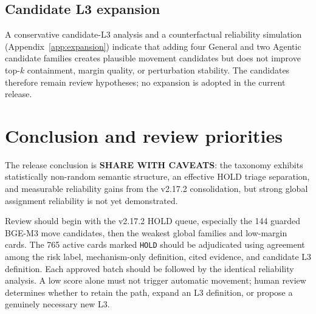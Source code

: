 \documentclass[11pt,a4paper]{article}
\newcommand{\code}[1]{\texttt{#1}}
\begin{document}
\subsection{Candidate L3 expansion}

A conservative candidate-L3 analysis and a counterfactual reliability
simulation (Appendix~\ref{app:expansion}) indicate that adding four General
and two Agentic candidate families creates plausible movement candidates but
does not improve top-$k$ containment, margin quality, or perturbation
stability. The candidates therefore remain review hypotheses; no expansion is
adopted in the current release.

\section{Conclusion and review priorities}
\label{sec:conclusion}

The release conclusion is \textbf{SHARE WITH CAVEATS}: the taxonomy exhibits
statistically non-random semantic structure, an effective HOLD triage
separation, and measurable reliability gains from the v2.17.2 consolidation,
but strong global assignment reliability is not yet demonstrated.

Review should begin with the v2.17.2 HOLD queue, especially the 144 guarded
BGE-M3 move candidates, then the weakest global families and low-margin cards.
The 765 active cards marked \code{HOLD} should be adjudicated using agreement
among the risk label, mechanism-only definition, cited evidence, and candidate
L3 definition. Each approved batch should be followed by the identical
reliability analysis. A low score alone must not trigger automatic movement;
human review determines whether to retain the path, expand an L3 definition,
or propose a genuinely necessary new L3.
\end{document}
